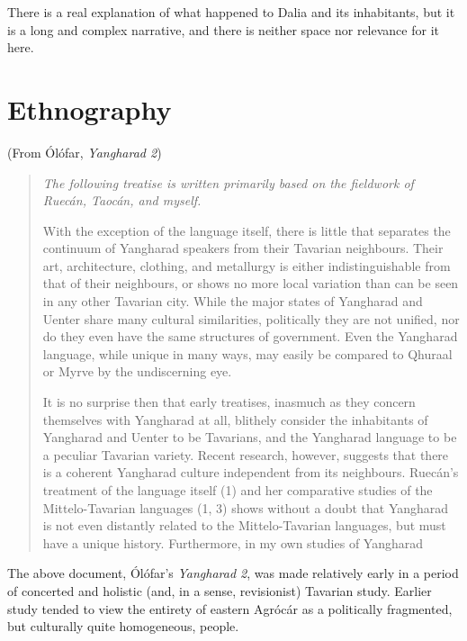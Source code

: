 \documentclass{article}
\begin{document}
There is a real explanation of what happened to Dalia and its inhabitants, but it is a long and complex narrative, and there is neither space nor relevance for it here.

\section*{Ethnography}

(From Ólófar, \textit{Yangharad 2})

\color{black}
\begin{quotation}

\textit{The following treatise is written primarily based on the fieldwork of Ruecán, Taocán, and myself.}

\hfill

With the exception of the language itself, there is little that separates the continuum of Yangharad speakers from their Tavarian neighbours. Their art, architecture, clothing, and metallurgy is either indistinguishable from that of their neighbours, or shows no more local variation than can be seen in any other Tavarian city. While the major states of Yangharad and Uenter share many cultural similarities, politically they are not unified, nor do they even have the same structures of government. Even the Yangharad language, while unique in many ways, may easily be compared to Qhuraal or Myrve by the undiscerning eye.

It is no surprise then that early treatises, inasmuch as they concern themselves with Yangharad at all, blithely consider the inhabitants of Yangharad and Uenter to be Tavarians, and the Yangharad language to be a peculiar Tavarian variety. Recent research, however, suggests that there is a coherent Yangharad culture independent from its neighbours. Ruecán's treatment of the language itself (1) and her comparative studies of the Mittelo-Tavarian languages (1, 3) shows without a doubt that Yangharad is not even distantly related to the Mittelo-Tavarian languages, but must have a unique history. Furthermore, in my own studies of Yangharad

\end{quotation}

\color{DarkGreen}


The above document, Ólófar's \textit{Yangharad 2}, was made relatively early in a period of concerted and holistic (and, in a sense, revisionist) Tavarian study. Earlier study tended to view the entirety of eastern Agrócár as a politically fragmented, but culturally quite homogeneous, people.
\end{document}
